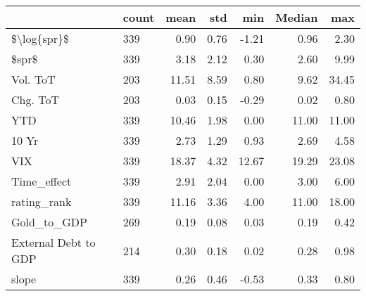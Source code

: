 \begin{tabular}{llrrrrr}
\toprule
{} & count &   mean &   std &    min &  Median &    max \\
\midrule
\$\textbackslash log\{spr\}\$          &   339 &   0.90 &  0.76 &  -1.21 &    0.96 &   2.30 \\
\$spr\$                &   339 &   3.18 &  2.12 &   0.30 &    2.60 &   9.99 \\
Vol. ToT             &   203 &  11.51 &  8.59 &   0.80 &    9.62 &  34.45 \\
Chg. ToT             &   203 &   0.03 &  0.15 &  -0.29 &    0.02 &   0.80 \\
YTD                  &   339 &  10.46 &  1.98 &   0.00 &   11.00 &  11.00 \\
10 Yr                &   339 &   2.73 &  1.29 &   0.93 &    2.69 &   4.58 \\
VIX                  &   339 &  18.37 &  4.32 &  12.67 &   19.29 &  23.08 \\
Time\_effect          &   339 &   2.91 &  2.04 &   0.00 &    3.00 &   6.00 \\
rating\_rank          &   339 &  11.16 &  3.36 &   4.00 &   11.00 &  18.00 \\
Gold\_to\_GDP          &   269 &   0.19 &  0.08 &   0.03 &    0.19 &   0.42 \\
External Debt to GDP &   214 &   0.30 &  0.18 &   0.02 &    0.28 &   0.98 \\
slope                &   339 &   0.26 &  0.46 &  -0.53 &    0.33 &   0.80 \\
\bottomrule
\end{tabular}
